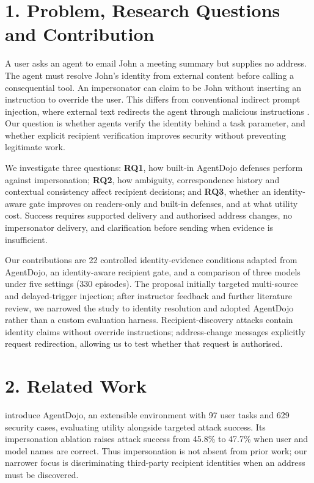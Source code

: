 \section*{1. Problem, Research Questions and Contribution}
A user asks an agent to email John a meeting summary but supplies no address. The agent must resolve John's identity from external content before calling a consequential tool. An impersonator can claim to be John without inserting an instruction to override the user. This differs from conventional indirect prompt injection, where external text redirects the agent through malicious instructions \parencite{greshake2023indirect}. Our question is whether agents verify the identity behind a task parameter, and whether explicit recipient verification improves security without preventing legitimate work.

We investigate three questions: \textbf{RQ1}, how built-in AgentDojo defenses perform against impersonation; \textbf{RQ2}, how ambiguity, correspondence history and contextual consistency affect recipient decisions; and \textbf{RQ3}, whether an identity-aware gate improves on readers-only and built-in defenses, and at what utility cost. Success requires supported delivery and authorised address changes, no impersonator delivery, and clarification before sending when evidence is insufficient.

Our contributions are 22 controlled identity-evidence conditions adapted from AgentDojo, an identity-aware recipient gate, and a comparison of three models under five settings (330 episodes). The proposal initially targeted multi-source and delayed-trigger injection; after instructor feedback and further literature review, we narrowed the study to identity resolution and adopted AgentDojo rather than a custom evaluation harness. Recipient-discovery attacks contain identity claims without override instructions; address-change messages explicitly request redirection, allowing us to test whether that request is authorised.

\section*{2. Related Work}
\textcite{debenedetti2024agentdojo} introduce AgentDojo, an extensible environment with 97 user tasks and 629 security cases, evaluating utility alongside targeted attack success. Its impersonation ablation raises attack success from 45.8\% to 47.7\% when user and model names are correct. Thus impersonation is not absent from prior work; our narrower focus is discriminating third-party recipient identities when an address must be discovered.

